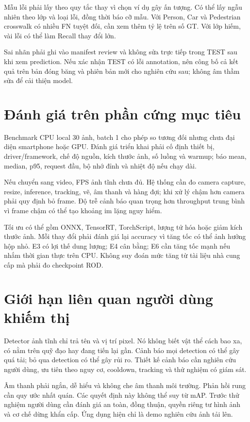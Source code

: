 \documentclass[12pt,a4paper,oneside]{report}
\begin{document}
Mẫu lỗi phải lấy theo quy tắc thay vì chọn ví dụ gây ấn tượng. Có thể lấy ngẫu nhiên theo lớp và loại lỗi, đồng thời báo cỡ mẫu. Với Person, Car và Pedestrian crosswalk có nhiều FN tuyệt đối, cần xem thêm tỷ lệ trên số GT. Với lớp hiếm, vài lỗi có thể làm Recall thay đổi lớn.

Sai nhãn phải ghi vào manifest review và không sửa trực tiếp trong TEST sau khi xem prediction. Nếu xác nhận TEST có lỗi annotation, nên công bố cả kết quả trên bản đóng băng và phiên bản mới cho nghiên cứu sau; không âm thầm sửa để cải thiện model.

\section{Đánh giá trên phần cứng mục tiêu}
Benchmark CPU local 30 ảnh, batch 1 cho phép so tương đối nhưng chưa đại diện smartphone hoặc GPU. Đánh giá triển khai phải cố định thiết bị, driver/framework, chế độ nguồn, kích thước ảnh, số luồng và warmup; báo mean, median, p95, request đầu, bộ nhớ đỉnh và nhiệt độ nếu chạy dài.

Nếu chuyển sang video, FPS ảnh tĩnh chưa đủ. Hệ thống cần đo camera capture, resize, inference, tracking, vẽ, âm thanh và hàng đợi; khi xử lý chậm hơn camera phải quy định bỏ frame. Độ trễ cảnh báo quan trọng hơn throughput trung bình vì frame chậm có thể tạo khoảng im lặng nguy hiểm.

Tối ưu có thể gồm ONNX, TensorRT, TorchScript, lượng tử hóa hoặc giảm kích thước ảnh. Mỗi thay đổi phải đánh giá lại accuracy vì tăng tốc có thể ảnh hưởng hộp nhỏ. E3 có lợi thế dung lượng; E4 cân bằng; E6 cần tăng tốc mạnh nếu nhắm thời gian thực trên CPU. Không suy đoán mức tăng từ tài liệu nhà cung cấp mà phải đo checkpoint ROD.

\section{Giới hạn liên quan người dùng khiếm thị}
Detector ảnh tĩnh chỉ trả tên và vị trí pixel. Nó không biết vật thể cách bao xa, có nằm trên quỹ đạo hay đang tiến lại gần. Cảnh báo mọi detection có thể gây quá tải; bỏ qua detection có thể gây rủi ro. Thiết kế cảnh báo cần nghiên cứu người dùng, ưu tiên theo nguy cơ, cooldown, tracking và thử nghiệm có giám sát.

Âm thanh phải ngắn, dễ hiểu và không che âm thanh môi trường. Phản hồi rung cần quy ước nhất quán. Các quyết định này không thể suy từ mAP. Trước thử nghiệm người dùng cần đánh giá an toàn, đồng thuận, quyền riêng tư hình ảnh và cơ chế dừng khẩn cấp. Ứng dụng hiện chỉ là demo nghiên cứu ảnh tải lên.
\end{document}
